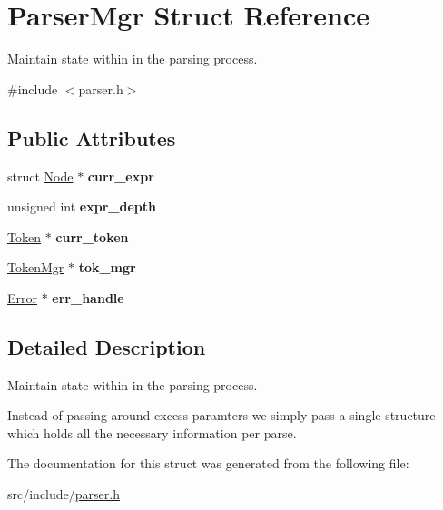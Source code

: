 \hypertarget{struct_parser_mgr}{}\section{Parser\+Mgr Struct Reference}
\label{struct_parser_mgr}


Maintain state within in the parsing process.  




{\ttfamily \#include $<$parser.\+h$>$}

\subsection*{Public Attributes}
\begin{DoxyCompactItemize}
\item 
\mbox{\label{struct_parser_mgr_ab0e632e38653f0b572f9389247148084}} 
struct \mbox{\hyperlink{struct_node}{Node}} $\ast$ {\bfseries curr\+\_\+expr}
\item 
\mbox{\label{struct_parser_mgr_ac10dc0846d693c106a2620b2906ed729}} 
unsigned int {\bfseries expr\+\_\+depth}
\item 
\mbox{\label{struct_parser_mgr_a2f91e648f300891d40e0fb2b903789c0}} 
\mbox{\hyperlink{struct_token}{Token}} $\ast$ {\bfseries curr\+\_\+token}
\item 
\mbox{\label{struct_parser_mgr_a2f758482ba8935ae5709f66d4295d320}} 
\mbox{\hyperlink{struct_token_mgr}{Token\+Mgr}} $\ast$ {\bfseries tok\+\_\+mgr}
\item 
\mbox{\label{struct_parser_mgr_a35287ee719c8ac8f666cc8ebc2ac7003}} 
\mbox{\hyperlink{struct_error}{Error}} $\ast$ {\bfseries err\+\_\+handle}
\end{DoxyCompactItemize}


\subsection{Detailed Description}
Maintain state within in the parsing process. 

Instead of passing around excess paramters we simply pass a single structure which holds all the necessary information per parse. 

The documentation for this struct was generated from the following file\+:\begin{DoxyCompactItemize}
\item 
src/include/\mbox{\hyperlink{parser_8h}{parser.\+h}}\end{DoxyCompactItemize}
